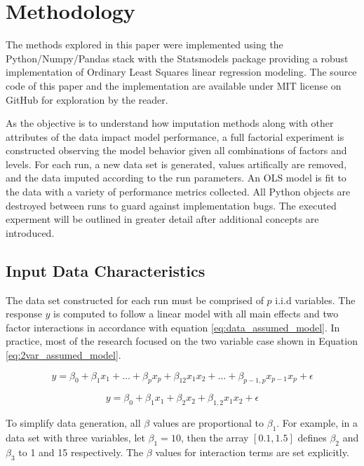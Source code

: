\documentclass[../../paper.tex]{subfiles}
\begin{document}
\section{Methodology}
The methods explored in this paper were implemented using
the Python/Numpy/Pandas stack with the Statsmodels package providing a robust
implementation of Ordinary Least Squares linear regression modeling.
The source code of this paper and the implementation are available under MIT license on GitHub for exploration by the reader.

As the objective is to understand how imputation methods along with other attributes of the data impact model performance, a full factorial experiment is constructed observing the model behavior given all combinations of factors and levels.
For each run, a new data set is generated, values artifically are removed, and the data imputed according to the run parameters. An OLS model is fit to the data  with a variety of performance metrics collected. All Python objects are destroyed between runs to guard against implementation bugs. The executed experment will be outlined in greater detail after additional concepts are introduced.


\subsection{Input Data Characteristics}
The data set constructed for each run must be comprised of $p$ i.i.d variables.
The response $y$ is computed to follow a linear model with all main effects and two factor interactions
in accordance with equation \ref{eq:data_assumed_model}. In practice, most of
the research focused on the two variable case shown in Equation
\ref{eq:2var_assumed_model}.

\begin{equation}\label{eq:data_assumed_model}
  y = \beta_{0} + \beta_{ 1 } x_{1}  + \ldots + \beta_{p}x_{p} +
  \beta_{12}x_{1}x_{2} + \ldots +\beta_{p-1,p}x_{p-1}x_{p} + \epsilon
\end{equation}


\begin{equation}\label{eq:2var_assumed_model}
  y = \beta_{0} + \beta_{1} x_{1} + \beta_{2}x_{2} +
  \beta_{1,2} x_{1}x_{2} + \epsilon
\end{equation}

To simplify data generation, all $\beta$ values are proportional to $\beta_{1}$.
For example, in a data set with three variables, let $\beta_{1} = 10$, then
the array $[0.1, 1.5]$ defines $\beta_{2}$ and $\beta_{3}$ to 1 and 15 respectively.
The $\beta$ values for interaction terms are set explicitly.
\end{document}
